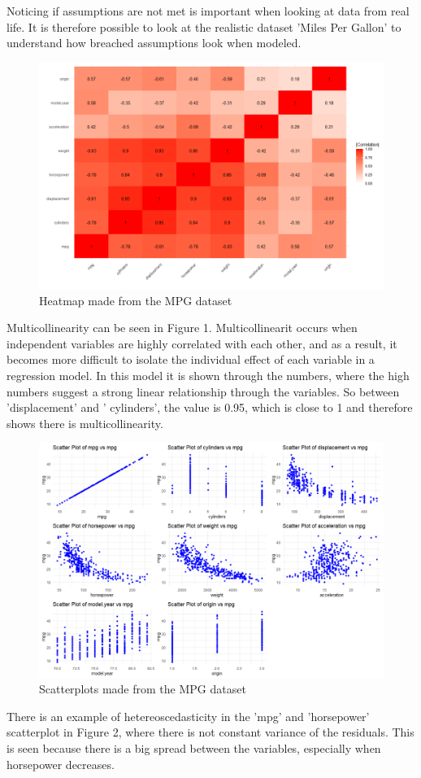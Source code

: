 Noticing if assumptions are not met is important when looking at data from real life.
It is therefore possible to look at the realistic dataset 'Miles Per Gallon' to understand how breached assumptions look when modeled. \newline

\begin{figure}
	\centering
		\centering
		\includegraphics[width=\linewidth]{billder/1.png}
		\caption{Heatmap made from the MPG dataset}
		\label{fig:1}
 \end{figure}

Multicollinearity can be seen in Figure 1. Multicollinearit occurs when independent variables are highly correlated with each other, and as a result, it becomes more difficult to isolate the individual effect of each variable in a regression model.
In this model it is shown through the numbers, where the high numbers suggest a strong linear relationship through the variables. So between 'displacement' and ' cylinders', the value is 0.95, which is close to 1 and therefore shows there is multicollinearity. \newline

\begin{figure}
	\centering
	\centering
	\includegraphics[width=\linewidth]{billder/2.png}
	\caption{Scatterplots made from the MPG dataset}
	\label{fig:2}
\end{figure}
There is an example of hetereoscedasticity in the 'mpg' and 'horsepower' scatterplot in Figure 2, where there is not constant variance of the residuals. This is seen because there is a big spread between the variables, especially when horsepower decreases.   
